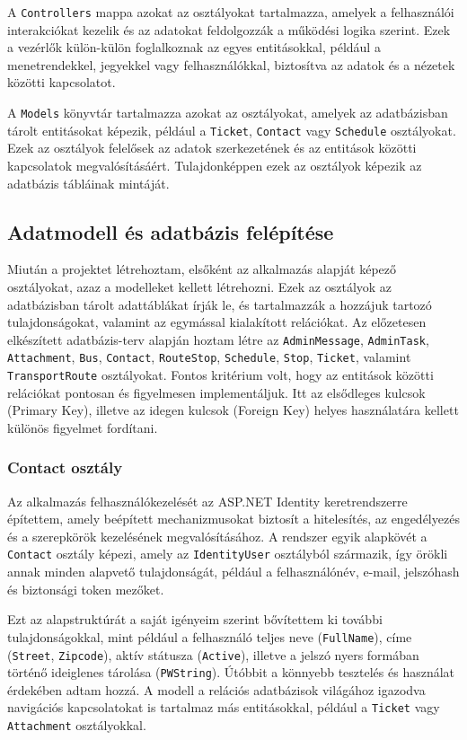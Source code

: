 A \texttt{Controllers} mappa azokat az osztályokat tartalmazza, amelyek a felhasználói interakciókat kezelik és az adatokat feldolgozzák a működési logika szerint. Ezek a vezérlők külön-külön foglalkoznak az egyes entitásokkal, például a menetrendekkel, jegyekkel vagy felhasználókkal, biztosítva az adatok és a nézetek közötti kapcsolatot.

A \texttt{Models} könyvtár tartalmazza azokat az osztályokat, amelyek az adatbázisban tárolt entitásokat képezik, például a \texttt{Ticket}, \texttt{Contact} vagy \texttt{Schedule} osztályokat. Ezek az osztályok felelősek az adatok szerkezetének és az entitások közötti kapcsolatok megvalósításáért. Tulajdonképpen ezek az osztályok képezik az adatbázis tábláinak mintáját.


\subsection{Adatmodell és adatbázis felépítése}

Miután a projektet létrehoztam, elsőként az alkalmazás alapját képező osztályokat, azaz a modelleket kellett létrehozni. Ezek az osztályok az adatbázisban tárolt adattáblákat írják le, és tartalmazzák a hozzájuk tartozó tulajdonságokat, valamint az egymással kialakított relációkat. Az előzetesen elkészített adatbázis-terv alapján hoztam létre az \texttt{AdminMessage}, \texttt{AdminTask}, \texttt{Attachment}, \texttt{Bus}, \texttt{Contact}, \texttt{RouteStop}, \texttt{Schedule}, \texttt{Stop}, \texttt{Ticket}, valamint \texttt{TransportRoute} osztályokat. Fontos kritérium volt, hogy az entitások közötti relációkat pontosan és figyelmesen implementáljuk. Itt az elsődleges kulcsok (Primary Key), illetve az idegen kulcsok (Foreign Key) helyes használatára kellett különös figyelmet fordítani.

\subsubsection{Contact osztály}
Az alkalmazás felhasználókezelését az ASP.NET Identity keretrendszerre építettem, amely beépített mechanizmusokat biztosít a hitelesítés, az engedélyezés és a szerepkörök kezelésének megvalósításához. A rendszer egyik alapkövét a \texttt{Contact} osztály képezi, amely az \texttt{IdentityUser} osztályból származik, így örökli annak minden alapvető tulajdonságát, például a felhasználónév, e-mail, jelszóhash és biztonsági token mezőket.

Ezt az alapstruktúrát a saját igényeim szerint bővítettem ki további tulajdonságokkal, mint például a felhasználó teljes neve (\texttt{FullName}), címe (\texttt{Street}, \texttt{Zipcode}), aktív státusza (\texttt{Active}), illetve a jelszó nyers formában történő ideiglenes tárolása (\texttt{PWString}). Útóbbit a könnyebb tesztelés és használat érdekében adtam hozzá. A modell a relációs adatbázisok világához igazodva navigációs kapcsolatokat is tartalmaz más entitásokkal, például a \texttt{Ticket} vagy \texttt{Attachment} osztályokkal.


